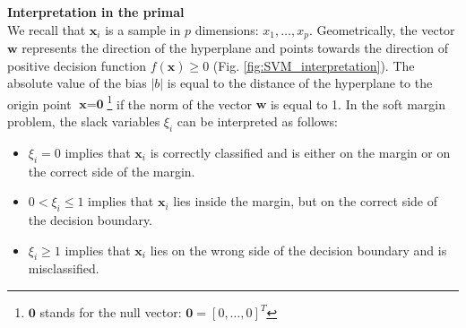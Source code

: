 %
%


\noindent \textbf{Interpretation in the primal} \\
We recall that $\textbf{x}_i$ is a sample in $p$ dimensions: $x_1, \ldots, x_p$. Geometrically, the vector $\textbf{w}$ represents the direction of the hyperplane and points towards the direction of positive decision function $f(\textbf{x}) \geq 0$ (Fig. \ref{fig:SVM_interpretation}). The absolute value of the bias $|b|$ is equal to the distance of the hyperplane to the origin point $\textbf{x}=\textbf{0}$\footnote{$\textbf{0}$ stands for the null vector: $\textbf{0} = [0, \ldots ,0]^T$} if the norm of the vector $\textbf{w}$ is equal to 1. In the soft margin problem, the slack variables $\xi_i$ can be interpreted as follows:
\begin{itemize}
	\item $\xi_i = 0$ implies that $\textbf{x}_i$ is correctly classified and is either on the margin or on the correct side of the margin.
	\item $0 < \xi_i \leq 1$ implies that $\textbf{x}_i$ lies inside the margin, but on the correct side of the decision boundary.
	\item $\xi_i \geq 1$ implies that $\textbf{x}_i$ lies on the wrong side of the decision boundary and is misclassified.
\end{itemize}

